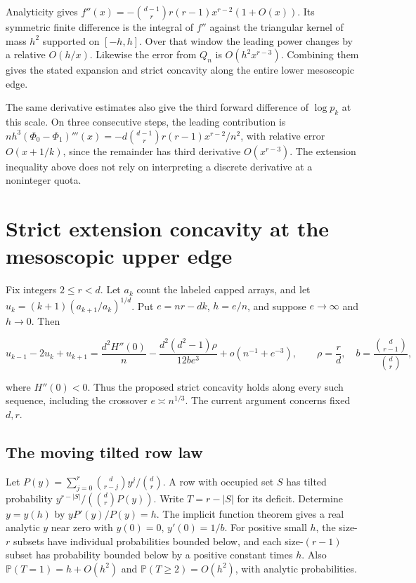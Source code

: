 \documentclass[11pt]{article}
\begin{document}
Analyticity gives $f''(x)=-\binom{d-1}{r}r(r-1)x^{r-2}(1+O(x))$. Its symmetric finite difference is the integral of $f''$ against the triangular kernel of mass $h^2$ supported on $[-h,h]$. Over that window the leading power changes by a relative $O(h/x)$. Likewise the error from $Q_n$ is $O(h^2x^{r-3})$. Combining them gives the stated expansion and strict concavity along the entire lower mesoscopic edge.

The same derivative estimates also give the third forward difference of $\log p_k$ at this scale. On three consecutive steps, the leading contribution is $n h^3(\Phi_0-\Phi_1)'''(x)=-d\binom{d-1}{r}r(r-1)x^{r-2}/n^2$, with relative error $O(x+1/k)$, since the remainder has third derivative $O(x^{r-3})$. The extension inequality above does not rely on interpreting a discrete derivative at a noninteger quota.

\section{Strict extension concavity at the mesoscopic upper edge}\label{sec:upper}

Fix integers $2\le r<d$. Let $a_k$ count the labeled capped arrays, and let
$u_k=(k+1)(a_{k+1}/a_k)^{1/d}$. Put $e=nr-dk$, $h=e/n$, and suppose
$e\to\infty$ and $h\to0$. Then

\begin{equation*}
u_{k-1}-2u_k+u_{k+1}
=\frac{d^2H''(0)}n-\frac{d^2(d^2-1)\rho}{12b e^3}
+o(n^{-1}+e^{-3}), \qquad
\rho=\frac rd,\quad b=\frac{\binom d{r-1}}{\binom dr},
\end{equation*}

where $H''(0)<0$. Thus the proposed strict concavity holds along every such sequence, including the crossover $e\asymp n^{1/3}$. The current argument concerns fixed $d,r$.

\subsection{The moving tilted row law}

Let $P(y)=\sum_{j=0}^r\binom d{r-j}y^j/\binom dr$. A row with occupied set $S$ has tilted probability $y^{r-|S|}/(\binom dr P(y))$. Write $T=r-|S|$ for its deficit. Determine $y=y(h)$ by $yP'(y)/P(y)=h$. The implicit function theorem gives a real analytic $y$ near zero with $y(0)=0$, $y'(0)=1/b$. For positive small $h$, the size-$r$ subsets have individual probabilities bounded below, and each size-$(r-1)$ subset has probability bounded below by a positive constant times $h$. Also $\mathbb P(T=1)=h+O(h^2)$ and $\mathbb P(T\ge2)=O(h^2)$, with analytic probabilities.
\end{document}
